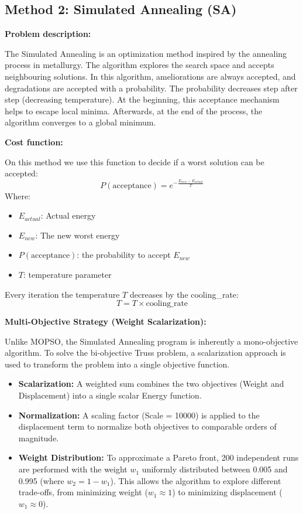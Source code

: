 \subsection{Method 2: Simulated Annealing (SA)}

\textbf{Problem description:}

The Simulated Annealing is an optimization method inspired by the annealing process in metallurgy. The algorithm explores the search space and accepts neighbouring solutions. In this algorithm, ameliorations are always accepted, and degradations are accepted with a probability. The probability decreases step after step (decreasing temperature). At the beginning, this acceptance mechanism helps to escape local minima. Afterwards, at the end of the process, the algorithm converges to a global minimum.

\textbf{Cost function:}

On this method we use this function to decide if a worst solution can be accepted:
\begin{equation}
P(\text{acceptance}) = e^{-\frac{E_{new} - E_{actual}}{T}}
\end{equation}
Where:
\begin{itemize}
    \item $E_{actual}$: Actual energy
    \item $E_{new}$: The new worst energy
    \item $P(\text{acceptance})$: the probability to accept $E_{new}$
    \item $T$: temperature parameter
\end{itemize}

Every iteration the temperature $T$ decreases by the cooling\_rate:
\begin{equation}
T = T \times \text{cooling\_rate}
\end{equation}

\textbf{Multi-Objective Strategy (Weight Scalarization):}

Unlike MOPSO, the Simulated Annealing program is inherently a mono-objective algorithm. To solve the bi-objective Truss problem, a scalarization approach is used to transform the problem into a single objective function.
\begin{itemize}
    \item \textbf{Scalarization:} A weighted sum combines the two objectives (Weight and Displacement) into a single scalar Energy function.
    \item \textbf{Normalization:} A scaling factor (Scale = 10000) is applied to the displacement term to normalize both objectives to comparable orders of magnitude.
    \item \textbf{Weight Distribution:} To approximate a Pareto front, 200 independent runs are performed with the weight $w_1$ uniformly distributed between 0.005 and 0.995 (where $w_2 = 1 - w_1$). This allows the algorithm to explore different trade-offs, from minimizing weight ($w_1 \approx 1$) to minimizing displacement ($w_1 \approx 0$).
\end{itemize}

